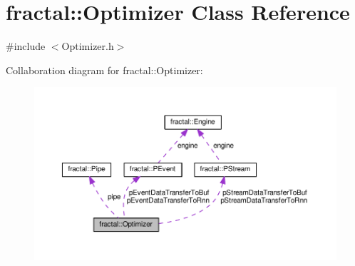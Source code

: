 \hypertarget{classfractal_1_1Optimizer}{\section{fractal\+:\+:Optimizer Class Reference}
\label{classfractal_1_1Optimizer}
}


{\ttfamily \#include $<$Optimizer.\+h$>$}



Collaboration diagram for fractal\+:\+:Optimizer\+:\nopagebreak
\begin{figure}[H]
\begin{center}
\leavevmode
\includegraphics[width=350pt]{d1/dba/classfractal_1_1Optimizer__coll__graph}
\end{center}
\end{figure}

